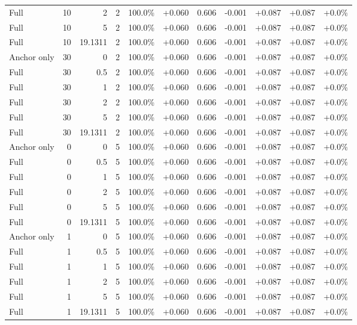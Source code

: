 \begin{table}[htbp]
\begin{tabular}{lrrrccccccc}
Full & 10 & 2 & 2 & 100.0\% & +0.060 & 0.606 & -0.001 & +0.087 & +0.087 & +0.0\% \\
Full & 10 & 5 & 2 & 100.0\% & +0.060 & 0.606 & -0.001 & +0.087 & +0.087 & +0.0\% \\
Full & 10 & 19.1311 & 2 & 100.0\% & +0.060 & 0.606 & -0.001 & +0.087 & +0.087 & +0.0\% \\
Anchor only & 30 & 0 & 2 & 100.0\% & +0.060 & 0.606 & -0.001 & +0.087 & +0.087 & +0.0\% \\
Full & 30 & 0.5 & 2 & 100.0\% & +0.060 & 0.606 & -0.001 & +0.087 & +0.087 & +0.0\% \\
Full & 30 & 1 & 2 & 100.0\% & +0.060 & 0.606 & -0.001 & +0.087 & +0.087 & +0.0\% \\
Full & 30 & 2 & 2 & 100.0\% & +0.060 & 0.606 & -0.001 & +0.087 & +0.087 & +0.0\% \\
Full & 30 & 5 & 2 & 100.0\% & +0.060 & 0.606 & -0.001 & +0.087 & +0.087 & +0.0\% \\
Full & 30 & 19.1311 & 2 & 100.0\% & +0.060 & 0.606 & -0.001 & +0.087 & +0.087 & +0.0\% \\
Anchor only & 0 & 0 & 5 & 100.0\% & +0.060 & 0.606 & -0.001 & +0.087 & +0.087 & +0.0\% \\
Full & 0 & 0.5 & 5 & 100.0\% & +0.060 & 0.606 & -0.001 & +0.087 & +0.087 & +0.0\% \\
Full & 0 & 1 & 5 & 100.0\% & +0.060 & 0.606 & -0.001 & +0.087 & +0.087 & +0.0\% \\
Full & 0 & 2 & 5 & 100.0\% & +0.060 & 0.606 & -0.001 & +0.087 & +0.087 & +0.0\% \\
Full & 0 & 5 & 5 & 100.0\% & +0.060 & 0.606 & -0.001 & +0.087 & +0.087 & +0.0\% \\
Full & 0 & 19.1311 & 5 & 100.0\% & +0.060 & 0.606 & -0.001 & +0.087 & +0.087 & +0.0\% \\
Anchor only & 1 & 0 & 5 & 100.0\% & +0.060 & 0.606 & -0.001 & +0.087 & +0.087 & +0.0\% \\
Full & 1 & 0.5 & 5 & 100.0\% & +0.060 & 0.606 & -0.001 & +0.087 & +0.087 & +0.0\% \\
Full & 1 & 1 & 5 & 100.0\% & +0.060 & 0.606 & -0.001 & +0.087 & +0.087 & +0.0\% \\
Full & 1 & 2 & 5 & 100.0\% & +0.060 & 0.606 & -0.001 & +0.087 & +0.087 & +0.0\% \\
Full & 1 & 5 & 5 & 100.0\% & +0.060 & 0.606 & -0.001 & +0.087 & +0.087 & +0.0\% \\
Full & 1 & 19.1311 & 5 & 100.0\% & +0.060 & 0.606 & -0.001 & +0.087 & +0.087 & +0.0\% \\

\end{tabular}
\end{table}

